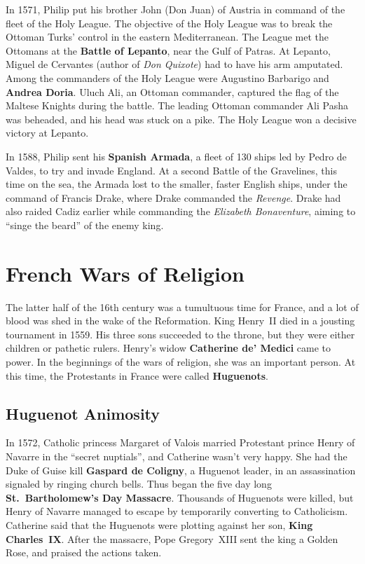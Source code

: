 In 1571,
Philip put his brother John (Don Juan) of Austria in command of the fleet of the Holy League.
The objective of the Holy League
was to break the Ottoman Turks' control in the eastern Mediterranean.
The League met the Ottomans at the \textbf{Battle of Lepanto}, near the Gulf of Patras.
At Lepanto, Miguel de Cervantes (author of \textit{Don Quixote}) had to have his arm amputated.
Among the commanders of the Holy League were Augustino Barbarigo and \textbf{Andrea Doria}.
Uluch Ali, an Ottoman commander, captured the flag of the Maltese Knights during the battle.
The leading Ottoman commander Ali Pasha was beheaded, and his head was stuck on a pike.
The Holy League won a decisive victory at Lepanto.

In 1588, Philip sent his \textbf{Spanish Armada}, a fleet of 130 ships led by Pedro de Valdes,
to try and invade England.
At a second Battle of the Gravelines, this time on the sea,
the Armada lost to the smaller, faster English ships, under the command of Francis Drake,
where Drake commanded the \textit{Revenge}.
Drake had also raided Cadiz earlier while commanding the \textit{Elizabeth Bonaventure},
aiming to ``singe the beard'' of the enemy king.

\section{French Wars of Religion}

The latter half of the 16th century was a tumultuous time for France,
and a lot of blood was shed in the wake of the Reformation.
King Henry~II died in a jousting tournament in 1559.
His three sons succeeded to the throne, but they were either children or pathetic rulers.
Henry's widow \textbf{Catherine de' Medici} came to power.
In the beginnings of the wars of religion, she was an important person.
At this time, the Protestants in France were called \textbf{Huguenots}.

\subsection*{Huguenot Animosity}

In 1572, Catholic princess Margaret of Valois married
Protestant prince Henry of Navarre in the ``secret nuptials'', and Catherine wasn't very happy.
She had the Duke of Guise kill \textbf{Gaspard de Coligny}, a Huguenot leader,
in an assassination signaled by ringing church bells.
Thus began the five day long \textbf{St.\ Bartholomew's Day Massacre}.
Thousands of Huguenots were killed,
but Henry of Navarre managed to escape by temporarily converting to Catholicism.
Catherine said that the Huguenots were plotting against her son, \textbf{King Charles~IX}\@.
After the massacre, Pope Gregory~XIII sent the king a Golden Rose, and praised the actions taken.

